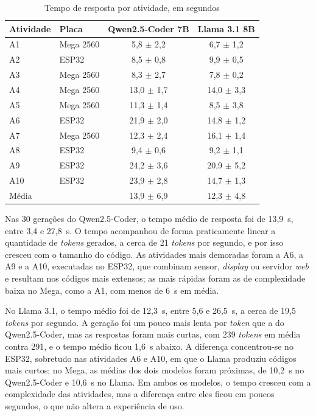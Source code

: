 \begin{table}[!htb]
  \centering
  \caption{Tempo de resposta por atividade, em segundos}
  \label{tab:response-time}
  \begin{tabular}{llcc}
    \toprule
    Atividade & Placa & Qwen2.5-Coder 7B & Llama 3.1 8B \\
    \midrule
    A1    & Mega 2560 & 5,8 $\pm$ 2,2 & 6,7 $\pm$ 1,2 \\
    A2    & ESP32     & 8,5 $\pm$ 0,8 & 9,9 $\pm$ 0,5 \\
    A3    & Mega 2560 & 8,3 $\pm$ 2,7 & 7,8 $\pm$ 0,2 \\
    A4    & Mega 2560 & 13,0 $\pm$ 1,7 & 14,0 $\pm$ 3,3 \\
    A5    & Mega 2560 & 11,3 $\pm$ 1,4 & 8,5 $\pm$ 3,8 \\
    A6    & ESP32     & 21,9 $\pm$ 2,0 & 14,8 $\pm$ 1,2 \\
    A7    & Mega 2560 & 12,3 $\pm$ 2,4 & 16,1 $\pm$ 1,4 \\
    A8    & ESP32     & 9,4 $\pm$ 0,6 & 9,2 $\pm$ 1,1 \\
    A9    & ESP32     & 24,2 $\pm$ 3,6 & 20,9 $\pm$ 5,2 \\
    A10   & ESP32     & 23,9 $\pm$ 2,8 & 14,7 $\pm$ 1,3 \\
    \midrule
    Média &           & 13,9 $\pm$ 6,9 & 12,3 $\pm$ 4,8 \\
    \bottomrule
  \end{tabular}
\end{table}

Nas 30 gerações do Qwen2.5-Coder, o tempo médio de resposta foi de 13,9~s, entre 3,4 e 27,8~s. O tempo acompanhou de forma praticamente linear a quantidade de \textit{tokens} gerados, a cerca de 21 \textit{tokens} por segundo, e por isso cresceu com o tamanho do código. As atividades mais demoradas foram a A6, a A9 e a A10, executadas no ESP32, que combinam sensor, \textit{display} ou servidor \textit{web} e resultam nos códigos mais extensos; as mais rápidas foram as de complexidade baixa no Mega, como a A1, com menos de 6~s em média.

No Llama 3.1, o tempo médio foi de 12,3~s, entre 5,6 e 26,5~s, a cerca de 19,5 \textit{tokens} por segundo. A geração foi um pouco mais lenta por \textit{token} que a do Qwen2.5-Coder, mas as respostas foram mais curtas, com 239 \textit{tokens} em média contra 291, e o tempo médio ficou 1,6~s abaixo. A diferença concentrou-se no ESP32, sobretudo nas atividades A6 e A10, em que o Llama produziu códigos mais curtos; no Mega, as médias dos dois modelos foram próximas, de 10,2~s no Qwen2.5-Coder e 10,6~s no Llama. Em ambos os modelos, o tempo cresceu com a complexidade das atividades, mas a diferença entre eles ficou em poucos segundos, o que não altera a experiência de uso.

